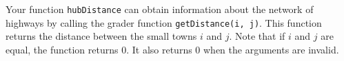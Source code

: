 Your function \texttt{hubDistance} can obtain information about the network of highways by calling the grader function \texttt{getDistance(i, j)}. This function returns the distance between the small towns $i$ and $j$. Note that if $i$ and $j$ are equal, the function returns 0. It also returns 0 when the arguments are invalid.